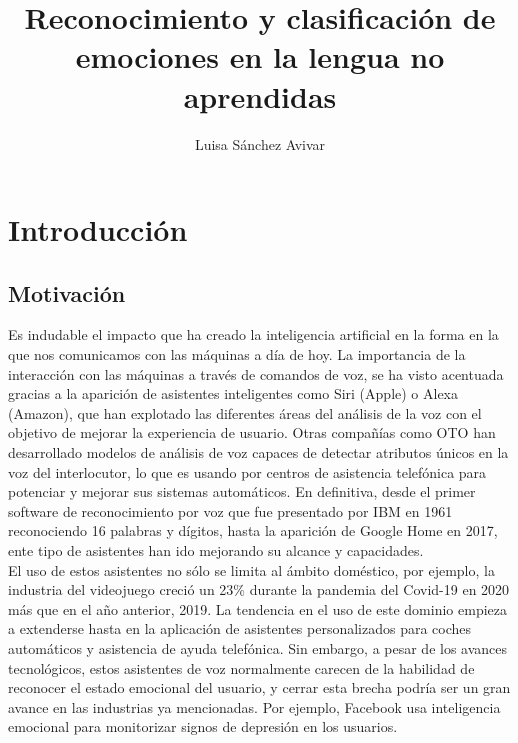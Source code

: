 \documentclass[11pt,a4paper,spanish]{book}
\begin{document}
	\title{Reconocimiento y clasificación de emociones en la lengua no aprendidas}
	\author{Luisa Sánchez Avivar}
	
	
	\mainmatter
	\chapter{Introducción}
	
	
	\section{Motivación}
	Es indudable el impacto que ha creado la inteligencia artificial en la forma en la que nos comunicamos con las máquinas a día de hoy. La importancia de la interacción con las máquinas a través de comandos de voz, se ha visto acentuada gracias a la aparición de asistentes inteligentes como Siri (Apple) o Alexa (Amazon), que han explotado las diferentes áreas del análisis de la voz con el objetivo de mejorar la experiencia de usuario. Otras compañías como OTO han desarrollado modelos de análisis de voz capaces de detectar atributos únicos en la voz del interlocutor, lo que es usando por centros de asistencia telefónica para potenciar y mejorar sus sistemas automáticos.
	En definitiva, desde el primer software de reconocimiento por voz que fue presentado por IBM en 1961 reconociendo 16 palabras y dígitos, hasta la aparición de Google Home en 2017, ente tipo de asistentes han ido mejorando su alcance y capacidades.\\
	
	El uso de estos asistentes no sólo se limita al ámbito doméstico, por ejemplo, la industria del videojuego creció un 23\% durante la pandemia del Covid-19 en 2020 más que en el año anterior, 2019. La tendencia en el uso de este dominio empieza a extenderse hasta en la aplicación de asistentes personalizados para coches automáticos y asistencia de ayuda telefónica. 
	Sin embargo, a pesar de los avances tecnológicos, estos asistentes de voz normalmente carecen de la habilidad de reconocer el estado emocional del usuario, y cerrar esta brecha podría ser un gran avance en las industrias ya mencionadas. Por ejemplo, Facebook usa inteligencia emocional para monitorizar signos de depresión en los usuarios.
	
\end{document}
